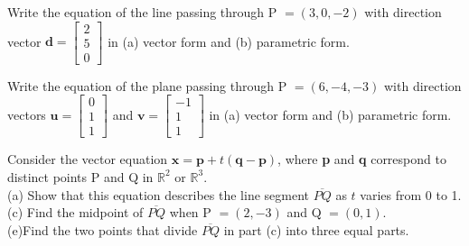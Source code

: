 \documentclass[11pt,letterpaper,boxed]{hmcpset}
\begin{document}


\pagebreak


\begin{problem}[\#6] 
Write the equation of the line passing through P $=(3,0,-2)$ with direction vector $\textbf{d}=\begin{bmatrix} 2 \\ 5 \\ 0 \end{bmatrix}$ in (a) vector form and (b) parametric form.
\end{problem}



\pagebreak


\begin{problem}[\#10] 
Write the equation of the plane passing through P $=(6,-4,-3)$ with direction vectors $\textbf{u}=\begin{bmatrix} 0 \\ 1 \\ 1 \end{bmatrix}$ and $\textbf{v}=\begin{bmatrix} -1 \\ 1 \\ 1 \end{bmatrix}$ in (a) vector form and (b) parametric form.
\end{problem}



\pagebreak


\begin{problem}[\#16ace] 
Consider the vector equation $\textbf{x} = \textbf{p} + t(\textbf{q} - \textbf{p})$, where \textbf{p} and \textbf{q} correspond to distinct points P and Q in $\mathbb{R}^2$ or $\mathbb{R}^3$.\\
(a) Show that this equation describes the line segment $\overline{PQ}$ as $t$ varies from 0 to 1.\\
(c) Find the midpoint of $\overline{PQ}$ when P $= (2,-3)$ and Q $=(0,1)$.\\
(e)Find the two points that divide $\overline{PQ}$ in part (c) into three equal parts.
\end{problem}
\end{document}

